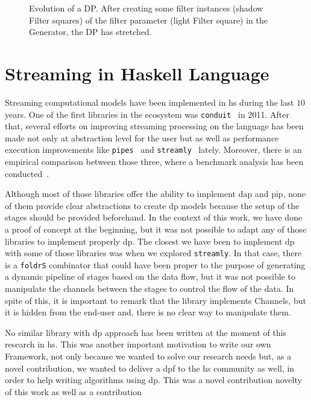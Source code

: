 \begin{figure}[h]
 \centering
 \caption[Evolution of DP]{Evolution of a DP. After creating some filter instances (shadow Filter squares) of the filter parameter (light Filter square) in the Generator, the DP has stretched.}
\label{fig:activeDP}
\end{figure}


\section{Streaming in Haskell Language}
Streaming computational models have been implemented in \acrfull{hs} during the last $10$ years. One of the first libraries in the ecosystem was \texttt{conduit}~\cite{conduit} in 2011.
After that, several efforts on improving streaming processing on the language has been made not only at abstraction level for the user but as well as performance execution 
improvements like \texttt{pipes}~\cite{pipes} and \texttt{streamly}~\cite{streamly} lately.
Moreover, there is an empirical comparison between those three, where a benchmark analysis has been conducted~\cite{benchstreamhs}.

Although most of those libraries offer the ability to implement \acrshort{dap} and \acrshort{pip}, none of them provide clear abstractions to create \acrshort{dp} models because
the setup of the stages should be provided beforehand. In the context of this work, we have done a proof of concept at the beginning, 
but it was not possible to adapt any of those libraries to implement properly \acrshort{dp}. 
The closest we have been to implement \acrshort{dp} with some of those libraries was when we explored \texttt{streamly}.
In that case, there is a \texttt{foldrS} combinator that could have been proper to the purpose of generating a dynamic pipeline of stages based on the data flow, but it was not possible to manipulate the channels between the stages to control the flow of the data. 
In spite of this, it is important to remark that the library implements Channels, but it is hidden from the end-user and, there is no clear way to manipulate them.

No similar library with \acrshort{dp} approach has been written at the moment of this research in \acrlong{hs}. 
This was another important motivation to write our own Framework, not only because we wanted to solve our research needs but, as a novel contribution, we wanted to deliver a \acrshort{dpf} to the \acrshort{hs} community as well, in order to help writing algorithms using \acrshort{dp}. 
This was a novel contribution novelty of this work as well as a contribution

